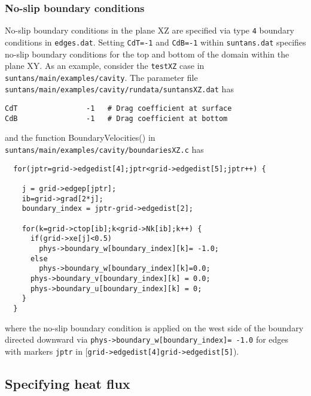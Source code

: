\subsubsection{No-slip boundary conditions}

No-slip boundary conditions in the plane XZ are specified via type \verb+4+ boundary conditions
in \verb+edges.dat+. Setting \verb+CdT=-1+ and \verb+CdB=-1+ within \verb+suntans.dat+ 
specifies no-slip boundary conditions for the top and bottom of the domain within the plane XY. 
As an example, consider the \verb+testXZ+ case in \verb+suntans/main/examples/cavity+.  The parameter file
\verb+suntans/main/examples/cavity/rundata/suntansXZ.dat+ has 
\begin{verbatim}
CdT                -1   # Drag coefficient at surface
CdB                -1   # Drag coefficient at bottom
\end{verbatim}
and the function BoundaryVelocities() in \verb+suntans/main/examples/cavity/boundariesXZ.c+ has
\begin{verbatim}
  for(jptr=grid->edgedist[4];jptr<grid->edgedist[5];jptr++) {
    
    j = grid->edgep[jptr];
    ib=grid->grad[2*j];
    boundary_index = jptr-grid->edgedist[2];
    
    for(k=grid->ctop[ib];k<grid->Nk[ib];k++) {
      if(grid->xe[j]<0.5) 
        phys->boundary_w[boundary_index][k]= -1.0;
      else
        phys->boundary_w[boundary_index][k]=0.0;
      phys->boundary_v[boundary_index][k] = 0.0;
      phys->boundary_u[boundary_index][k] = 0;
    }
  }
\end{verbatim}
where the no-slip boundary condition is applied on the west side of the boundary directed 
downward via \verb+phys->boundary_w[boundary_index]= -1.0+ for edges with markers \verb+jptr+ in
[\verb+grid->edgedist[4]+\verb+grid->edgedist[5]+).  

\subsection{Specifying heat flux} \label{sec:heatflux}


